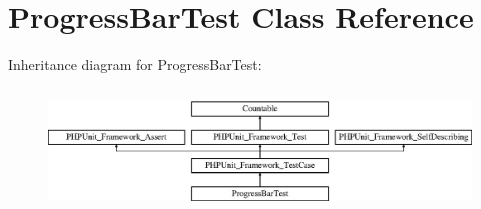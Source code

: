 \section{Progress\+Bar\+Test Class Reference}
\label{class_symfony_1_1_component_1_1_console_1_1_tests_1_1_helper_1_1_progress_bar_test}
Inheritance diagram for Progress\+Bar\+Test\+:\begin{figure}[H]
\begin{center}
\leavevmode
\includegraphics[height=3.303835cm]{class_symfony_1_1_component_1_1_console_1_1_tests_1_1_helper_1_1_progress_bar_test}
\end{center}
\end{figure}
